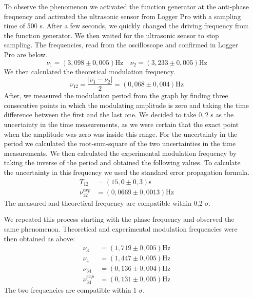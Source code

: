 \documentclass{article}
\begin{document}
To observe the phenomenon we activated the function generator at the anti-phase frequency and activated the ultrasonic sensor from Logger Pro with a sampling time of 500 s. After a few seconds, we quickly changed the driving frequency from the function generator. We then waited for the ultrasonic sensor to stop sampling. The frequencies, read from the oscilloscope and confirmed in Logger Pro are below.
\begin{equation}
    \nu_1 = ( 3,098 \pm 0,005) \text{Hz} \quad \nu_2 = ( 3,233 \pm 0,005) \text{Hz} 
\end{equation}
We then calculated the theoretical modulation frequency.
\begin{equation}
    \nu_{12} = \frac{|\nu_1 - \nu_2|}{2} = (0,068 \pm 0,004) \text{Hz}
\end{equation}
After, we measured the modulation period from the graph by finding three consecutive points in which the modulating amplitude is zero and taking the time difference between the first and the last one. We decided to take $0,2$ s as the uncertainty in the time measurements, as we were certain that the exact point when the amplitude was zero was inside this range. For the uncertainty in the period we calculated the root-sum-square of the two uncertainties in the time measurements. We then calculated the experimental modulation frequency by taking the inverse of the period and obtained the following values. To calculate the uncertainty in this frequency we used the standard error propagation formula.
\begin{align}
    T_{12} &= (15,0 \pm 0,3) \text{s} \\
    \nu_{12}^{exp} &= (0,0669 \pm 0,0013) \text{Hz} 
\end{align}
The measured and theoretical frequency are compatible within 0,2 $\sigma$.

We repeated this process starting with the phase frequency and observed the same phenomenon. Theoretical and experimental modulation frequencies were then obtained as above:
\begin{align}
    \nu_{3} &= (1,719 \pm 0,005) \text{Hz} \\
    \nu_{4} &= (1,447 \pm 0,005) \text{Hz} \\
    \nu_{34} &= (0,136 \pm 0,004) \text{Hz} \\
    \nu_{34}^{exp} &= (0,131 \pm 0,005) \text{Hz} 
\end{align}
The two frequencies are compatible within 1 $\sigma$.
\end{document}
